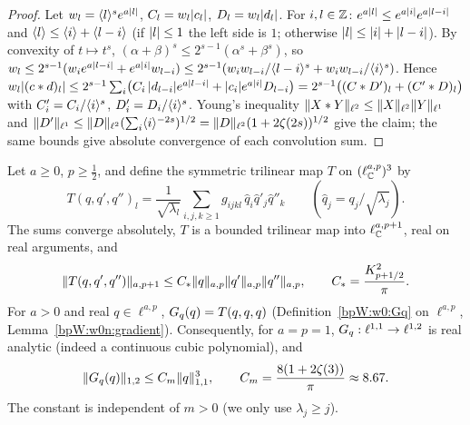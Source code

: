 \begin{proof}
Let $w_l=\langle l\rangle^se^{a\lvert l\rvert}$, $C_l=w_l\lvert c_l\rvert$, $D_l=w_l\lvert d_l\rvert$.
\label{stepW:w0n:weight}
For $i,l\in\mathbb{Z}$: $e^{a\lvert l\rvert}\le e^{a\lvert i\rvert}e^{a\lvert l-i\rvert}$ and $\langle l\rangle\le\langle i\rangle+\langle l-i\rangle$ (if $\lvert l\rvert\le1$ the left
side is $1$; otherwise $\lvert l\rvert\le\lvert i\rvert+\lvert l-i\rvert$). By convexity of $t\mapsto t^s$, $(\alpha+\beta)^s\le
2^{s-1}(\alpha^s+\beta^s)$, so $w_l\le2^{s-1}(w_ie^{a\lvert l-i\rvert}+e^{a\lvert i\rvert}w_{l-i})\le 2^{s-1}(w_iw_{l-i}/\langle l-i\rangle^s
+w_iw_{l-i}/\langle i\rangle^s)$.
\label{stepW:w0n:young}
Hence $w_l\lvert (c*d)_l\rvert\le2^{s-1}\sum_i\bigl(C_i\,\lvert d_{l-i}\rvert e^{a\lvert l-i\rvert}+\lvert c_i\rvert e^{a\lvert i\rvert}D_{l-i}\bigr)
=2^{s-1}\bigl((C*D')_l+(C'*D)_l\bigr)$ with $C'_i=C_i/\langle i\rangle^s$, $D'_i=D_i/\langle i\rangle^s$. Young's inequality
$\lVert X*Y\rVert_{\ell^2}\le\lVert X\rVert_{\ell^2}\lVert Y\rVert_{\ell^1}$ and $\lVert D'\rVert_{\ell^1}\le\lVert D\rVert_{\ell^2}
(\sum_i\langle i\rangle^{-2s})^{1/2}=\lVert D\rVert_{\ell^2}(1+2\zeta(2s))^{1/2}$ give the claim; the same bounds give absolute
convergence of each convolution sum.
\end{proof}

\begin{theorem}\label{bpW:w0n:cubic-bound}
Let $a\ge0$, $p\ge\frac12$, and define the symmetric trilinear map $T$ on $(\ell^{a,p}_{\mathbb{C}})^3$ by
\[T(q,q',q'')_l=\frac{1}{\sqrt{\lambda_l}}\sum_{i,j,k\ge1}g_{ijkl}\,\hat q_i\hat q'_j\hat q''_k\qquad
(\hat q_j=q_j/\sqrt{\lambda_j}).\]
The sums converge absolutely, $T$ is a bounded trilinear map into $\ell^{a,p+1}_{\mathbb{C}}$, real on real arguments, and
\[\lVert T(q,q',q'')\rVert_{a,p+1}\le C_*\lVert q\rVert_{a,p}\lVert q'\rVert_{a,p}\lVert q''\rVert_{a,p},\qquad
C_*=\frac{K_{p+1/2}^2}{\pi}.\]
For $a>0$ and real $q\in\ell^{a,p}$, $G_q(q)=T(q,q,q)$ (Definition~\ref{bpW:w0:Gq} on $\ell^{a,p}$,
Lemma~\ref{bpW:w0n:gradient}). Consequently, for $a=p=1$,
$G_q:\ell^{1,1}\to\ell^{1,2}$ is real analytic (indeed a continuous cubic polynomial), and
\[\lVert G_q(q)\rVert_{1,2}\le C_m\lVert q\rVert_{1,1}^3,\qquad C_m=\frac{8(1+2\zeta(3))}{\pi}\approx8.67.\]
The constant is independent of $m>0$ (we only use $\lambda_j\ge j$).
\end{theorem}

